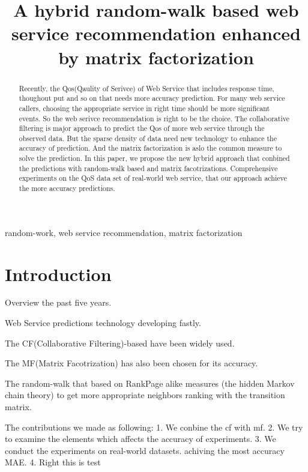 \documentclass[conference]{IEEEtran}
\begin{document}
\title{A hybrid random-walk based web service recommendation enhanced by matrix factorization}

\author{
  \and
}

\maketitle

\begin{abstract}
Recently, the Qos(Qaulity of Serivce) of Web Service that includes response time, thoughout put and so on that needs more accuracy prediction. For many web service  callers, choosing the appropriate service in right time should be more significant events. So the web serivce recommendation is right to be the choice. The collaborative filtering is major approach to predict the Qos of more web service through the observed data. But the sparse density of data need new technology to enhance the accuracy of prediction. And the matrix factorization is aslo the common measure to solve the prediction. In this paper, we propose the new hybrid approach that conbined the predictions with random-walk based and matrix facotrizations. Comprehensive experiments on the QoS data set of real-world web service, that our approach achieve the more accuracy predictions.
\end{abstract}

\begin{IEEEkeywords}
  random-work, web service recommendation, matrix factorization
\end{IEEEkeywords}

\IEEEpeerreviewmaketitle


\section{Introduction}
Overview the past five years.
\par Web Service predictions technology developing fastly.
\par The CF(Collaborative Filtering)-based have been widely used.
\par The MF(Matrix Facotrization) has also been chosen for its accuracy.
\par The random-walk that based on RankPage alike measures (the hidden Markov chain theory) to get more appropriate neighbors ranking with the transition matrix.
\par The contributions we made as following:
1. We conbine the cf with mf.
2. We try to examine the elements which affects the accuracy of experiments.
3. We conduct the experiments on real-world datasets. achiving the most accuracy MAE.
4. Right this is test
\end{document}
